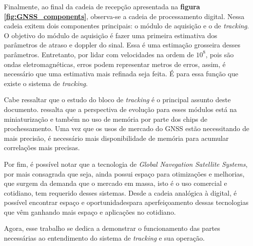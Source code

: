 Finalmente, ao final da cadeia de recepção apresentada na \textbf{figura \ref{fig:GNSS_components}}, observa-se a cadeia de processamento digital. Nessa cadeia exitem dois componentes principais: o módulo de aquisição e o de \textit{tracking}. O objetivo do módulo de aquisição é fazer uma primeira estimativa dos parâmetros de atraso e doppler do sinal. Essa é uma estimação grosseira desses parâmetros. Entretanto, por lidar com velocidades na ordem de $10^8$, pois são ondas eletromagnéticas, erros podem representar metros de erros, assim, é necessário que uma estimativa mais refinada seja feita. É para essa função que existe o sistema de \textit{tracking}.

Cabe ressaltar que o estudo do bloco de \textit{tracking} é o principal assunto deste documento. \cite{Antreich2022} ressalta que a perspectiva de evolução para esses módulos está na miniaturização e também no uso de memória por parte dos chips de prochessamento. Uma vez que os usos de mercado do GNSS estão necessitando de mais precisão, é necessário mais disponibilidade de memória para acumular correlações mais precisas.

Por fim, é possível notar que a tecnologia de \textit{Global Navegation Satellite Systems}, por mais consagrada que seja, ainda possui espaço para otimizações e melhorias, que surgem da demanda que o mercado em massa, isto é o uso comercial e cotidiano, tem requerido desses sistemas. Desde a cadeia analógica à digital, é possível encontrar espaço e oportunidadespara aperfeiçoamento dessas tecnologias que vêm ganhando mais espaço e aplicações no cotidiano.

Agora, esse trabalho se dedica a demonstrar o funcionamento das partes necessárias ao entendimento do sistema de \textit{tracking} e sua operação.